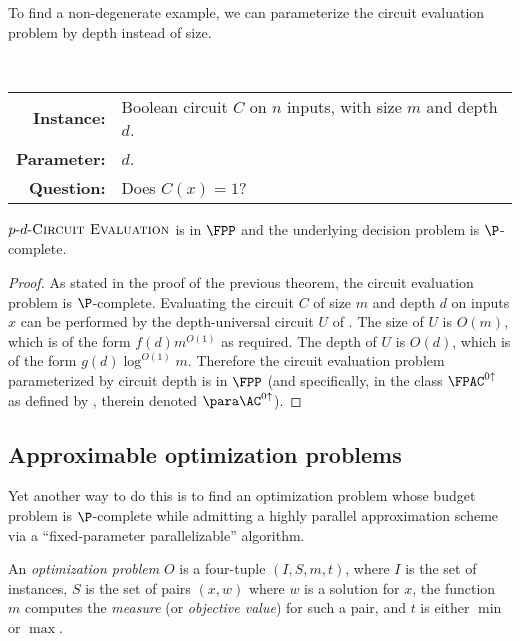 \documentclass{article}
\newcommand{\dash}{\textnormal{-}}
\begin{document}
To find a non-degenerate example, we can parameterize the circuit evaluation problem by depth instead of size.

\begin{definition}[$p \dash d \dash \textsc{Circuit Evaluation}$]
  \mbox{} \\
  \begin{tabular}{r p{9.2cm}}
    \textbf{Instance:} & Boolean circuit $C$ on $n$ inputs, with size $m$ and depth $d$. \\
    \textbf{Parameter:} & $d$. \\
    \textbf{Question:} & Does $C(x) = 1$?
  \end{tabular}
\end{definition}

\begin{theorem}
  $p \dash d \dash \textsc{Circuit Evaluation}$ is in $\FPP$ and the underlying decision problem is $\P$-complete.
\end{theorem}
\begin{proof}
  As stated in the proof of the previous theorem, the circuit evaluation problem is $\P$-complete.
  Evaluating the circuit $C$ of size $m$ and depth $d$ on inputs $x$ can be performed by the depth-universal circuit $U$ of \autocite{ch85}.
  The size of $U$ is $O(m)$, which is of the form $f(d) m^{O(1)}$ as required.
  The depth of $U$ is $O(d)$, which is of the form $g(d) \log^{O(1)} m$.
  Therefore the circuit evaluation problem parameterized by circuit depth is in $\FPP$ (and specifically, in the class $\FPAC^{0 \uparrow}$ as defined by \autocite{bst15}, therein denoted $\para\AC^{0 \uparrow}$).
\end{proof}

\subsection{Approximable optimization problems}

Yet another way to do this is to find an optimization problem whose budget problem is $\P$-complete while admitting a highly parallel approximation scheme via a ``fixed-parameter parallelizable'' algorithm.

\begin{definition}
  An \emph{optimization problem} $O$ is a four-tuple $(I, S, m, t)$, where $I$ is the set of instances, $S$ is the set of pairs $(x, w)$ where $w$ is a solution for $x$, the function $m$ computes the \emph{measure} (or \emph{objective value}) for such a pair, and $t$ is either $\min$ or $\max$.
\end{definition}
\end{document}
